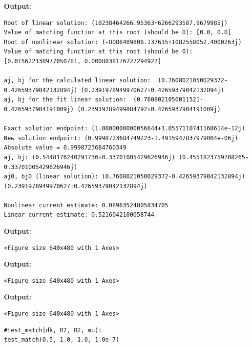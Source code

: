 \documentclass{article}
\begin{document}
\textbf{Output:}\begin{verbatim}
Root of linear solution: (10238464266.95363+6266293587.9679985j)
Value of matching function at this root (should be 0): [0.0, 0.0]
Root of nonlinear solution: (-8088409808.137615+1082558052.4000263j)
Value of matching function at this root (should be 0): [0.015622138977050781, 0.0008838176727294922]

aj, bj for the calculated linear solution:  (0.7608021050029372-0.42659379042132894j) (0.2391978949970627+0.42659379042132894j)
aj, bj for the fit linear solution:  (0.7608021050011521-0.4265937904191009j) (0.23919789499884792+0.4265937904191009j)

Exact solution endpoint: (1.0000000000056644+1.0557110741160614e-12j)
New solution endpoint: (0.9998723684749223-1.4915947837979004e-06j) Absolute value = 0.9998723684760349
aj, bj: (0.5448176240291736+0.33701005429626946j) (0.4551823759708265-0.33701005429626946j)
aj0, bj0 (linear solution): (0.7608021050029372-0.42659379042132894j) (0.2391978949970627+0.42659379042132894j)

Nonlinear current estimate: 0.08963524805834705
Linear current estimate: 0.5216042100058744

\end{verbatim}

\textbf{Output:}\begin{verbatim}
<Figure size 640x480 with 1 Axes>
\end{verbatim}

\textbf{Output:}\begin{verbatim}
<Figure size 640x480 with 1 Axes>
\end{verbatim}

\textbf{Output:}\begin{verbatim}
<Figure size 640x480 with 1 Axes>
\end{verbatim}

\begin{lstlisting}
#test_match(dk, R2, B2, mu):
test_match(0.5, 1.0, 1.0, 1.0e-7)\end{lstlisting}
\end{document}
